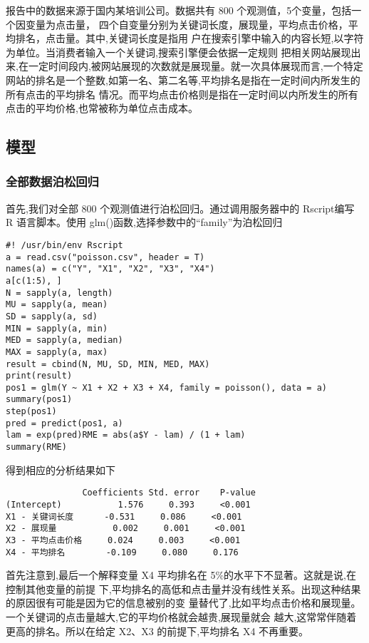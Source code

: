 报告中的数据来源于国内某培训公司。数据共有 800
个观测值，5个变量，包括一个因变量为点击量，
四个自变量分别为关键词长度，展现量，平均点击价格，平均排名，点击量。其中,关键词长度是指用
户在搜索引擎中输入的内容长短,以字符为单位。当消费者输入一个关键词,搜索引擎便会依据一定规则
把相关网站展现出来,在一定时间段内,被网站展现的次数就是展现量。就一次具体展现而言,一个特定
网站的排名是一个整数,如第一名、第二名等,平均排名是指在一定时间内所发生的所有点击的平均排名
情况。而平均点击价格则是指在一定时间以内所发生的所有点击的平均价格,也常被称为单位点击成本。

\subsection{模型}\label{ux6a21ux578b}

\subsubsection{全部数据泊松回归}\label{ux5168ux90e8ux6570ux636eux6ccaux677eux56deux5f52}

首先,我们对全部 800 个观测值进行泊松回归。通过调用服务器中的 Rscript编写
R 语言脚本。使用 glm()函数,选择参数中的``family''为泊松回归

\begin{lstlisting}
#! /usr/bin/env Rscript
a = read.csv("poisson.csv", header = T)
names(a) = c("Y", "X1", "X2", "X3", "X4")
a[c(1:5), ]
N = sapply(a, length)
MU = sapply(a, mean)
SD = sapply(a, sd)
MIN = sapply(a, min)
MED = sapply(a, median)
MAX = sapply(a, max)
result = cbind(N, MU, SD, MIN, MED, MAX)
print(result)
pos1 = glm(Y ~ X1 + X2 + X3 + X4, family = poisson(), data = a)
summary(pos1)
step(pos1)
pred = predict(pos1, a)
lam = exp(pred)RME = abs(a$Y - lam) / (1 + lam)
summary(RME)
\end{lstlisting}

得到相应的分析结果如下

\begin{lstlisting}
               Coefficients Std. error    P-value
(Intercept)           1.576     0.393     <0.001
X1 - 关键词长度      -0.531     0.086     <0.001
X2 - 展现量           0.002     0.001     <0.001
X3 - 平均点击价格     0.024     0.003     <0.001
X4 - 平均排名        -0.109     0.080     0.176
\end{lstlisting}

首先注意到,最后一个解释变量 X4 平均排名在
5\%的水平下不显著。这就是说,在控制其他变量的前提
下,平均排名的高低和点击量并没有线性关系。出现这种结果的原因很有可能是因为它的信息被别的变
量替代了,比如平均点击价格和展现量。一个关键词的点击量越大,它的平均价格就会越贵,展现量就会
越大,这常常伴随着更高的排名。所以在给定 X2、X3 的前提下,平均排名 X4
不再重要。

